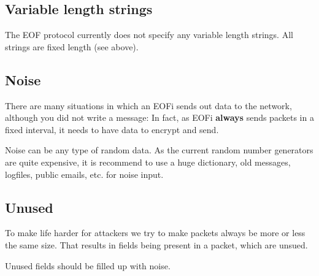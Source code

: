 \subsection{Variable length strings}
The EOF protocol currently does not specify any variable length strings.
All strings are fixed length (see above).
\subsection{Noise}
There are many situations in which an EOFi sends out data to the network,
although you did not write a message: In fact, as EOFi \textbf{always}
sends packets in a fixed interval, it needs to have data to encrypt and send.

Noise can be any type of random data. As the current random number generators
are quite expensive, it is recommend to use a huge dictionary, old
messages, logfiles, public emails, etc. for noise input.
\subsection{Unused}
To make life harder for attackers we try to make packets always be more or
less the same size. That results in fields being present in a packet, which
are unsued.

Unused fields should be filled up with noise.

